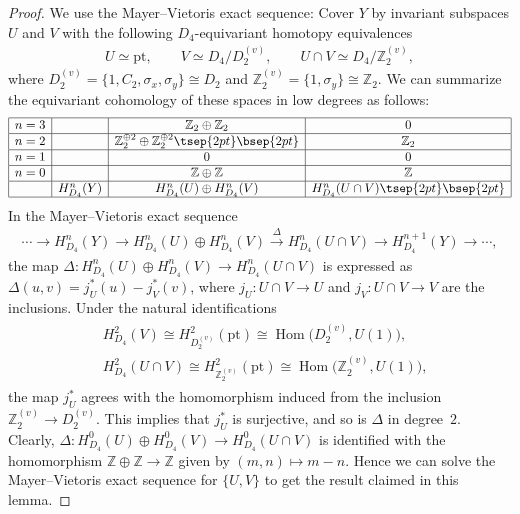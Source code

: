 \documentclass[pdftex]{sigma}
\theoremstyle{definition}
\newcommand{\Z}{\mathbb{Z}}
\newcommand{\pt}{\mathrm{pt}}
\begin{document}
\begin{proof}
We use the Mayer--Vietoris exact sequence: Cover $Y$ by invariant subspaces $U$ and $V$ with the following $D_4$-equivariant homotopy equivalences
\begin{gather*}
U \simeq \pt, \qquad V \simeq D_4/D_2^{(v)}, \qquad U \cap V \simeq D_4/\Z_2^{(v)},
\end{gather*}
where $D_2^{(v)} = \{ 1, C_2, \sigma_x, \sigma_y \} \cong D_2$ and $\Z_2^{(v)} = \{ 1, \sigma_y \} \cong \Z_2$. We can summarize the equivariant cohomology of these spaces in low degrees as follows:
$$
\begin{array}{|c|c|c|c|}
\hline
n = 3 & & \Z_2 \oplus \Z_2 & 0 \\
\hline
n = 2 & & \Z_2^{\oplus 2} \oplus \Z_2^{\oplus 2} \tsep{2pt}\bsep{2pt} & \Z_2 \\
\hline
n = 1 & & 0 & 0 \\
\hline
n = 0 & & \Z \oplus \Z & \Z \\
\hline
& H^n_{D_4}(Y) & H^n_{D_4}(U) \oplus H^n_{D_4}(V) &
H^n_{D_4}(U \cap V)\tsep{2pt}\bsep{2pt}\\
\hline
\end{array}
$$
In the Mayer--Vietoris exact sequence
\begin{gather*}
\cdots \to H^n_{D_4}(Y) \to H^n_{D_4}(U) \oplus H^n_{D_4}(V) \overset{\Delta}{\to} H^n_{D_4}(U \cap V) \to H^{n+1}_{D_4}(Y) \to \cdots,
\end{gather*}
the map $\Delta \colon H^n_{D_4}(U) \oplus H^n_{D_4}(V) \to H^n_{D_4}(U \cap V)$ is expressed as $\Delta(u, v) = j_U^*(u) - j_V^*(v)$, where $j_U \colon U \cap V \to U$ and $j_V \colon U \cap V \to V$ are the inclusions. Under the natural identif\/ications
\begin{gather*}
\begin{split}
& H^2_{D_4}(V) \cong H^2_{D_2^{(v)}}(\pt) \cong \operatorname{Hom}\big(D_2^{(v)}, U(1)\big), \\
& H^2_{D_4}(U \cap V) \cong H^2_{\Z_2^{(v)}}(\pt) \cong \operatorname{Hom}\big(\Z_2^{(v)}, U(1)\big),
\end{split}
\end{gather*}
the map $j_U^*$ agrees with the homomorphism induced from the inclusion $\Z_2^{(v)} \to D_2^{(v)}$. This implies that $j_U^*$ is surjective, and so is $\Delta$ in degree~$2$. Clearly, $\Delta \colon H^0_{D_4}(U) \oplus H^0_{D_4}(V) \to H^0_{D_4}(U \cap V)$ is identif\/ied with the homomorphism $\Z \oplus \Z \to \Z$ given by $(m, n) \mapsto m - n$. Hence we can solve the Mayer--Vietoris exact sequence for $\{ U, V \}$ to get the result claimed in this lemma.
\end{proof}
\end{document}
